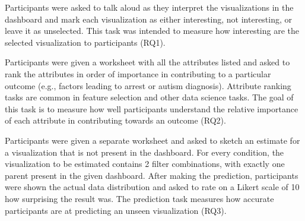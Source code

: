  Participants were asked to talk aloud as they interpret the visualizations in the dashboard and mark each visualization as either interesting, not interesting, or leave it as unselected. This task was intended to measure how interesting are the selected visualization to participants (RQ1).%

 Participants were given a worksheet with all the attributes listed and asked to rank the attributes in order of importance in contributing to a particular outcome (e.g., factors leading to arrest or autism diagnosis). Attribute ranking tasks are common in feature selection and other data science tasks. The goal of this task is to measure how well participants understand the relative importance of each attribute in contributing towards an outcome (RQ2).

 Participants were given a separate worksheet and asked to sketch an estimate for a visualization that is not present in the dashboard. For every condition, the visualization to be estimated contains 2 filter combinations, with exactly one parent present in the given dashboard. After making the prediction, participants were shown the actual data distribution and asked to rate on a Likert scale of 10 how surprising the result was. The prediction task measures how accurate participants are at predicting an unseen visualization (RQ3).


